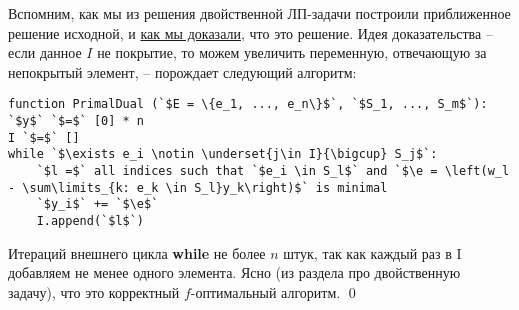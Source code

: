 Вспомним, как мы из решения двойственной ЛП-задачи построили приближенное решение исходной, и \underline{как мы доказали}, что это решение. Идея доказательства -- если данное $I$ не покрытие, то можем увеличить переменную, отвечающую за непокрытый элемент, -- порождает следующий алгоритм:

\begin{lstlisting}[escapeinside=``]
function PrimalDual (`$E = \{e_1, ..., e_n\}$`, `$S_1, ..., S_m$`):
`$y$` `$=$` [0] * n
I `$=$` []
while `$\exists e_i \notin \underset{j\in I}{\bigcup} S_j$`:
    `$l =$` all indices such that `$e_i \in S_l$` and `$\e = \left(w_l - \sum\limits_{k: e_k \in S_l}y_k\right)$` is minimal
    `$y_i$` += `$\e$`
    I.append(`$l$`)
\end{lstlisting}

Итераций внешнего цикла \textbf{while} не более $n$ штук, так как каждый раз в I добавляем не менее одного элемента. Ясно (из раздела про двойственную задачу), что это корректный $f$-оптимальный алгоритм. \qed
